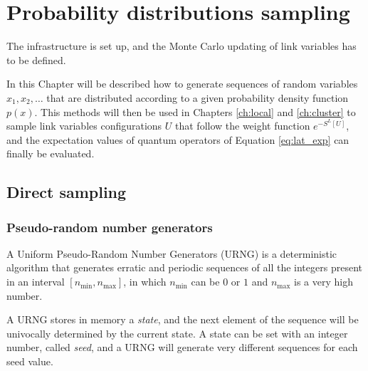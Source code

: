 \chapter{Probability distributions sampling}\label{ch:mc}

The infrastructure is set up, and the Monte Carlo updating of link variables has to be defined.

In this Chapter will be described how to generate sequences of random variables $x_1, x_2, \ldots$ that are distributed according to a given probability density function $p(x)$.
This methods will then be used in Chapters \ref{ch:local} and \ref{ch:cluster} to sample link variables configurations ${U}$ that follow the weight function $e^{-S^L[U]}$,
and the expectation values of quantum operators of Equation \eqref{eq:lat_exp} can finally be evaluated.

%
%

\section{Direct sampling}
\subsection*{Pseudo-random number generators}
A Uniform Pseudo-Random Number Generators (URNG) is a deterministic algorithm that generates erratic and periodic
sequences of all the integers present in an interval $[n_\mathrm{min},n_\mathrm{max}]$, in which $n_\mathrm{min}$ can be $0$ or $1$ and $n_\mathrm{max}$ is a very high number.

A URNG stores in memory a \emph{state}, and the next element of the sequence will be univocally determined by the current state.
A state can be set with an integer number, called \emph{seed}, and a URNG will generate very different sequences for each seed value. 

